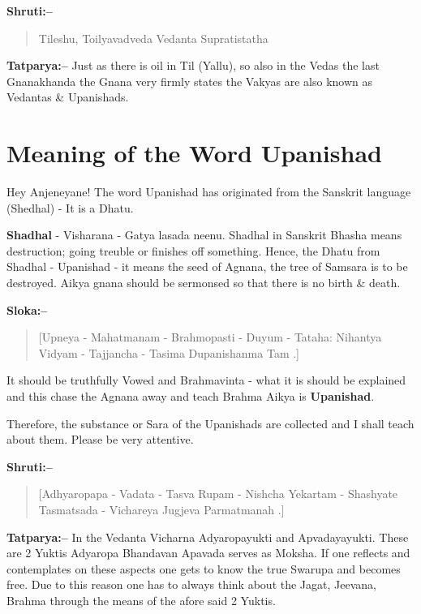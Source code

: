 \textbf{Shruti:–}

\begin{verse}
Tileshu, Toilyavadveda Vedanta Supratistatha 
\end{verse}

\textbf{Tatparya:–} Just as there is oil in Til (Yallu), so also in the Vedas the last Gnanakhanda the Gnana very firmly states the Vakyas are also known as Vedantas \& Upanishads.

\chapter{Meaning of the Word Upanishad}

Hey Anjeneyane! The word Upanishad has originated from the Sanskrit language (Shedhal) - It is a Dhatu.

\textbf{Shadhal} - Visharana - Gatya lasada neenu. Shadhal in Sanskrit Bhasha means destruction; going treuble or finishes off something. Hence, the Dhatu from Shadhal - Upanishad - it means the seed of Agnana, the tree of Samsara is to be destroyed. Aikya gnana should be sermonsed so that there is no birth \& death.

\textbf{Sloka:–}

\begin{verse}
[Upneya - Mahatmanam - Brahmopasti - Duyum - Tataha: Nihantya Vidyam - Tajjancha - Tasima Dupanishanma Tam .]
\end{verse}

It should be truthfully Vowed and Brahmavinta - what it is should be explained and this chase the Agnana away and teach Brahma Aikya is \textbf{Upanishad}.

Therefore, the substance or Sara of the Upanishads are collected and I shall teach about them. Please be very attentive.

\textbf{Shruti:–}

\begin{verse}
[Adhyaropapa - Vadata - Tasva Rupam - Nishcha Yekartam - Shashyate  Tasmatsada - Vichareya Jugjeva Parmatmanah .]
\end{verse}

\textbf{Tatparya:–} In the Vedanta Vicharna Adyaropayukti and Apvadaya\break yukti. These are 2 Yuktis Adyaropa Bhandavan Apavada serves as Moksha. If one reflects and contemplates on these aspects one gets to know the true Swarupa and becomes free. Due to this reason one has to always think about the Jagat, Jeevana, Brahma through the means of the afore said 2 Yuktis.

